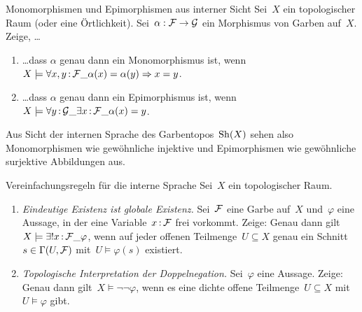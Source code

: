 \documentclass{pizzablatt}
\begin{document}

\begin{aufgabe}{Monomorphismen und Epimorphismen aus interner Sicht}
Sei~$X$ ein topologischer Raum (oder eine Örtlichkeit). Sei~$\alpha : \mathcal{F} \to
\mathcal{G}$ ein Morphismus von Garben auf~$X$. Zeige, \ldots
\begin{enumerate}
\item \ldots dass $\alpha$ genau dann ein Monomorphismus ist, wenn
$X \models \forall x,y\,{:}\,\mathcal{F}\_ \alpha(x) = \alpha(y) \Rightarrow x = y$.
\item \ldots dass $\alpha$ genau dann ein Epimorphismus ist, wenn
$X \models \forall y\,{:}\,\mathcal{G}\_ \exists x\,{:}\,\mathcal{F}\_ \alpha(x) = y$.
\end{enumerate}
Aus Sicht der internen Sprache des Garbentopos~$\mathrm{Sh}(X)$ sehen also
Monomorphismen wie gewöhnliche injektive und Epimorphismen wie
gewöhnliche surjektive Abbildungen aus.
\end{aufgabe}

\begin{aufgabe}{Vereinfachungsregeln für die interne Sprache}
Sei~$X$ ein topologischer Raum.
\begin{enumerate}
\item \emph{Eindeutige Existenz ist globale Existenz.}
Sei~$\mathcal{F}$ eine Garbe auf~$X$ und~$\varphi$ eine Aussage, in der eine
Variable~$x\,{:}\,\mathcal{F}$ frei vorkommt. Zeige: Genau dann gilt~$X \models \exists!
x\,{:}\,\mathcal{F}\_ \varphi$, wenn auf jeder offenen Teilmenge~$U \subseteq X$ genau ein
Schnitt~$s \in \Gamma(U,\mathcal{F})$ mit~$U \models \varphi(s)$ existiert.
\item \emph{Topologische Interpretation der Doppelnegation.}
Sei~$\varphi$ eine Aussage. Zeige: Genau dann gilt~$X \models
\neg\neg\varphi$, wenn es eine dichte offene Teilmenge~$U \subseteq X$ mit~$U
\models \varphi$ gibt.
\end{enumerate}
\end{aufgabe}
\end{document}
